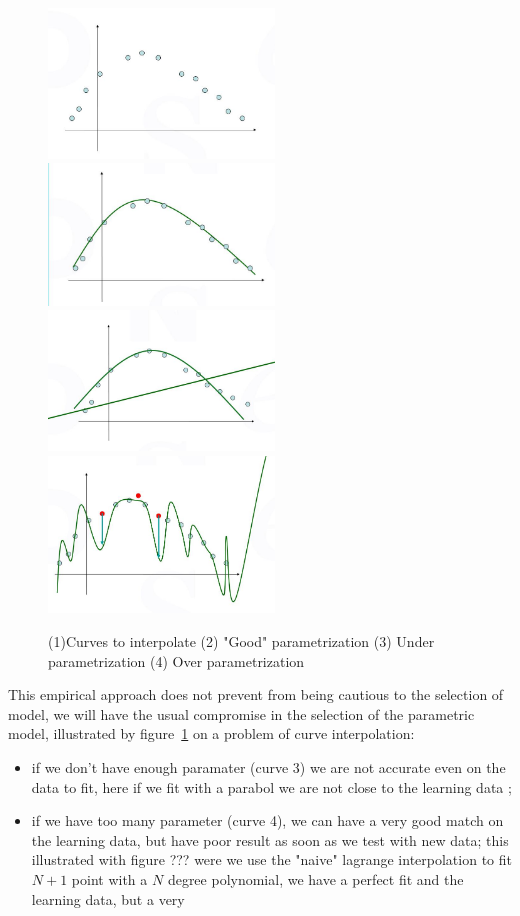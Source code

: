 \begin{figure}
\centering
\includegraphics[width=6cm]{Methods/Images/Courbe-Pts.jpg}
\includegraphics[width=6cm]{Methods/Images/CourbeGoodParam.jpg}\\
\includegraphics[width=6cm]{Methods/Images/Courbe-UndeParam.jpg}
\includegraphics[width=6cm]{Methods/Images/CourbeOverParam.jpg}
	\caption{(1)Curves to interpolate (2) "Good" parametrization (3) Under parametrization (4) Over parametrization}
	\label{fig:CurvesParam}
\end{figure}


This empirical approach does not prevent from being cautious
to the selection of model, we will have the usual compromise in the selection
of the parametric model, illustrated by figure~\ref{fig:CurvesParam}  on a problem of curve interpolation:


\begin{itemize}
	\item if we don't have enough paramater (curve 3) we are not accurate  even on the data to fit,
	   here if we fit with a parabol we are not close to the learning data ;

   \item if we  have too many parameter (curve 4), we can have a very good match on the learning data, but have 
	 poor result as soon as we test with new data; this illustrated with  figure ??? were
         we use the "naive" lagrange interpolation to fit $N+1$ point with a $N$ degree polynomial,
         we have a perfect fit and the learning data, but a very
\end{itemize}


